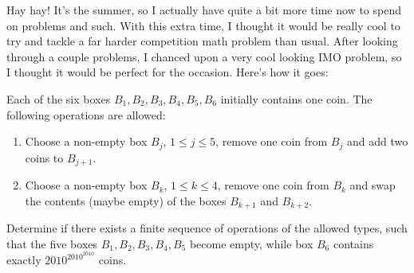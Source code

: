 \newcommand{\boxdiagram}[7][]{
    \begin{center}
    \begin{tikzpicture}
        \draw[thick] (0, 0) rectangle (1, 1);
        \draw[thick] (2, 0) rectangle (3, 1);
        \draw[thick] (4, 0) rectangle (5, 1);
        \draw[thick] (6, 0) rectangle (7, 1);
        \draw[thick] (8, 0) rectangle (9, 1);
        \draw[thick] (10, 0) rectangle (11, 1);

        \node at (0.5, 0.5) {#2};
        \node at (2.5, 0.5) {#3};
        \node at (4.5, 0.5) {#4};
        \node at (6.5, 0.5) {#5};
        \node at (8.5, 0.5) {#6};
        \node at (10.5, 0.5) {#7};

        \ifthenelse{\equal{#1}{}}{}{
            \draw[thick, ->] (5.5, -0.25) -- (5.5, -1.25);
            \node at (6, -0.75) {\ensuremath{#1}};
        }
    \end{tikzpicture}
    \end{center}
}

Hay hay! It's the summer, so I actually have quite a bit more time now to spend
on problems and such.  With this extra time, I thought
it would be really cool to try and tackle a far harder competition math problem
than usual. After looking through a couple problems, I chanced upon a very cool
looking IMO problem, so I thought it would be perfect for the occasion. Here's
how it goes:

\begin{blackbox}
    \begin{problem}
        Each of the six boxes \( B_1, B_2, B_3, B_4, B_5, B_6 \) initially
        contains one coin. The following operations are allowed:

        \begin{enumerate}[topsep=10pt, itemsep=5pt]
            \item Choose a non-empty box \( B_j \), \( 1 \leqslant j \leqslant 5 \), remove
                one coin from \( B_j \) and add two coins to \( B_{j + 1} \).
            \item Choose a non-empty box \( B_k \), \( 1 \leqslant k \leqslant 4 \), remove
                one coin from \( B_k \) and swap the contents (maybe empty) of
                the boxes \( B_{k+1} \) and \( B_{k+2} \).
        \end{enumerate}

        Determine if there exists a finite sequence of operations of the
        allowed types, such that the five boxes \( B_1, B_2, B_3, B_4, B_5 \)
        become empty, while box \( B_6 \) contains exactly \(
        2010^{2010^{2010}} \) coins.
    \end{problem}
\end{blackbox}

